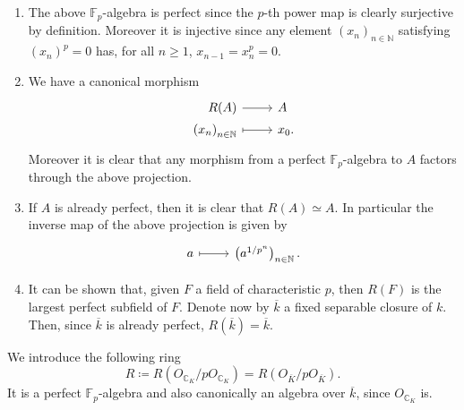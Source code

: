 \begin{rem}[]\leavevmode\vspace{-.2\baselineskip}
\begin{enumerate}
\item The above $\mathbb{F}_p$-algebra is perfect
	since the $p$-th power map is clearly surjective by definition.
	Moreover it is injective since any element $\left( x_n \right)_{n \in \mathbb{N}}$
	satisfying $\left( x_n \right)^p = 0$ has, for all $n \geq 1$,
	$x_{n-1} = x_n^p = 0$.

\item We have a canonical morphism
	\begin{equation*}
	\begin{tikzcd}[row sep = 0ex
		,/tikz/column 1/.append style={anchor=base east}
		,/tikz/column 2/.append style={anchor=base west}]
		R(A) \arrow[r, "", rightarrow] &
		A \\
		\left( x_n \right)_{n \in \mathbb{N}} \arrow[r, "", mapsto] & 
		x_0
	.\end{tikzcd}
	\end{equation*} 
	Moreover it is clear that any morphism from a perfect $\mathbb{F}_p$-algebra
	to $A$ factors through the above projection.

\item If $A$ is already perfect, then it is clear that $R(A) \simeq A$.
	In particular the inverse map of the above projection is given by
	\begin{equation*}
	\begin{tikzcd}[row sep = 0ex
		,/tikz/column 1/.append style={anchor=base east}
		,/tikz/column 2/.append style={anchor=base west}]
		a \arrow[r, "", mapsto] &
		\left( a^{1/p^n} \right)_{n \in \mathbb{N}}
	.\end{tikzcd}
	\end{equation*} 

\item It can be shown that, given $F$ a field of characteristic $p$, then $R(F)$ is the largest
	perfect subfield of $F$.
	Denote now by $\overline{k}$ a fixed separable closure of $k$.
	Then, since $\overline{k}$ is already perfect, $R(\overline{k}) = \overline{k}$.
\end{enumerate}
\end{rem}


\begin{ntt}[]
	We introduce the following ring
	\begin{equation*}
		R \coloneqq R(O_{\mathbb{C}_K}/pO_{\mathbb{C}_K}) =
		R(O_{\overline{K}}/pO_{\overline{K}})
	.\end{equation*}
	It is a perfect $\mathbb{F}_p$-algebra and also canonically an
	algebra over $\overline{k}$, since $O_{\mathbb{C}_K}$ is.
\end{ntt}


